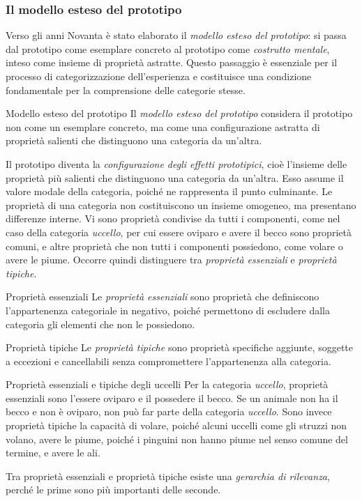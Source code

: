 \documentclass[a4paper]{article}
\begin{document}
\subsubsection{Il modello esteso del prototipo}
Verso gli anni Novanta è stato elaborato il \emph{modello esteso del prototipo}: si passa dal prototipo come esemplare concreto al prototipo come \emph{costrutto mentale}, inteso come insieme di proprietà astratte.
Questo passaggio è essenziale per il processo di categorizzazione dell'esperienza e costituisce una condizione fondamentale per la comprensione delle categorie stesse.
\begin{snippetdefinition}{Modello esteso del prototipo}
    Il \emph{modello esteso del prototipo} considera il prototipo non come un esemplare concreto, ma come una configurazione astratta di proprietà salienti che distinguono una categoria da un'altra.
\end{snippetdefinition}
Il prototipo diventa la \emph{configurazione degli effetti prototipici}, cioè l'insieme delle proprietà più salienti che distinguono una categoria da un'altra. Esso assume il valore modale della categoria, poiché ne rappresenta il punto culminante.
Le proprietà di una categoria non costituiscono un insieme omogeneo, ma presentano differenze interne. Vi sono proprietà condivise da tutti i componenti, come nel caso della categoria \emph{uccello}, per cui essere oviparo e avere il becco sono proprietà comuni, e altre proprietà che non tutti i componenti possiedono, come volare o avere le piume.
Occorre quindi distinguere tra \emph{proprietà essenziali} e \emph{proprietà tipiche}.
\begin{snippetdefinition}{Proprietà essenziali}
    Le \emph{proprietà essenziali} sono proprietà che definiscono l'appartenenza categoriale in negativo, poiché permettono di escludere dalla categoria gli elementi che non le possiedono.
\end{snippetdefinition}
\begin{snippetdefinition}{Proprietà tipiche}
    Le \emph{proprietà tipiche} sono proprietà specifiche aggiunte, soggette a eccezioni e cancellabili senza compromettere l'appartenenza alla categoria.
\end{snippetdefinition}
\begin{snippetexample}{Proprietà essenziali e tipiche degli uccelli}
    Per la categoria \emph{uccello}, proprietà essenziali sono l'essere oviparo e il possedere il becco. Se un animale non ha il becco e non è oviparo, non può far parte della categoria \emph{uccello}. Sono invece proprietà tipiche la capacità di volare, poiché alcuni uccelli come gli struzzi non volano, avere le piume, poiché i pinguini non hanno piume nel senso comune del termine, e avere le ali.
\end{snippetexample}
Tra proprietà essenziali e proprietà tipiche esiste una \emph{gerarchia di rilevanza}, perché le prime sono più importanti delle seconde.
\end{document}
